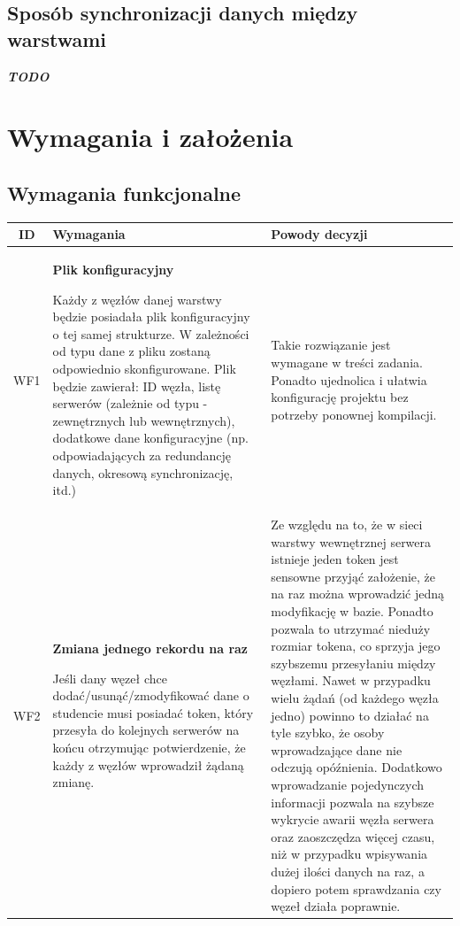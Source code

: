 {\subsection[Sposób synchronizacji danych między warstwami]{Sposób synchronizacji danych między warstwami}

\textit{\textbf{TODO}}

\section[Wymagania i założenia]{Wymagania i założenia}

\subsection[Wymagania funkcjonalne]{Wymagania funkcjonalne}

\begin{tabularx}{\textwidth}{|c|X|X|}
\hline
\textbf{ID} & \textbf{Wymagania}  & \textbf{Powody decyzji} \\
\hline

\label{z:WF1} WF1 & \textbf{Plik konfiguracyjny}


Każdy z węzłów danej warstwy będzie posiadała plik konfiguracyjny o tej samej strukturze. W zależności od typu dane z pliku zostaną odpowiednio skonfigurowane. Plik będzie zawierał: ID węzła, listę serwerów (zależnie od typu - zewnętrznych lub wewnętrznych), dodatkowe dane konfiguracyjne (np. odpowiadających za redundancję danych, okresową synchronizację, itd.) &
Takie rozwiązanie jest wymagane w treści zadania. Ponadto ujednolica i ułatwia konfigurację projektu bez potrzeby ponownej kompilacji.\\
\hline

\label{z:WF2} WF2 &  \textbf{Zmiana jednego rekordu na raz }

Jeśli dany węzeł chce dodać/usunąć/zmodyfikować dane o studencie musi posiadać token, który przesyła do kolejnych serwerów na końcu otrzymując potwierdzenie, że każdy z węzłów wprowadził żądaną zmianę. & 
Ze względu na to, że w sieci warstwy wewnętrznej serwera istnieje jeden token jest sensowne przyjąć założenie, że na raz można wprowadzić jedną modyfikację w bazie. Ponadto pozwala to utrzymać nieduży rozmiar tokena, co sprzyja jego szybszemu przesyłaniu między węzłami. Nawet w przypadku wielu żądań (od każdego węzła jedno) powinno to działać na tyle szybko, że osoby wprowadzające dane nie odczują opóźnienia. Dodatkowo wprowadzanie pojedynczych informacji pozwala na szybsze wykrycie awarii węzła serwera oraz zaoszczędza więcej czasu, niż w przypadku wpisywania dużej ilości danych na raz, a dopiero potem sprawdzania czy węzeł działa poprawnie. \\
\hline


\end{tabularx}}
